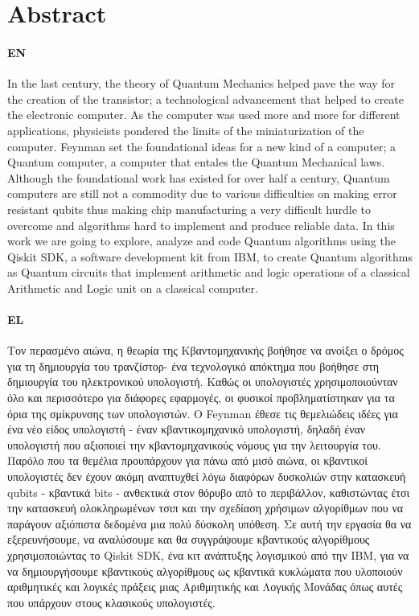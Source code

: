 \setlength{\parskip}{0pt}

\clearpage
\chapter*{Abstract}

\subsubsection{EN}
In the last century, the theory of Quantum Mechanics helped pave the way for the creation of the transistor; a 
technological advancement that helped to create the electronic computer. As the computer was used more and more
for different applications, physicists pondered the limits of the miniaturization of the computer. Feynman
set the foundational ideas for a new kind of a computer; a Quantum computer, a computer that entales the Quantum
Mechanical laws. Although the foundational work has existed for over half a century, Quantum computers are still not
a commodity due to various difficulties on making error resistant qubits thus making chip manufacturing a very
difficult hurdle to overcome and algorithms hard to implement and produce reliable data. In this work we are going
to explore, analyze and code Quantum algorithms using the Qiskit SDK, a software development kit from IBM, to
create Quantum algorithms as Quantum circuits that implement arithmetic and logic operations of a classical Arithmetic
and Logic unit on a classical computer.

\subsubsection{EL}
Τον περασμένο αιώνα, η θεωρία της Κβαντομηχανικής βοήθησε να ανοίξει ο δρόμος για τη δημιουργία του τρανζίστορ- ένα 
τεχνολογικό απόκτημα που βοήθησε στη δημιουργία του ηλεκτρονικού υπολογιστή. Καθώς οι υπολογιστές χρησιμοποιούνταν όλο και περισσότερο
για διάφορες εφαρμογές, οι φυσικοί προβληματίστηκαν για τα όρια της σμίκρυνσης των υπολογιστών. Ο Feynman
έθεσε τις θεμελιώδεις ιδέες για ένα νέο είδος υπολογιστή - έναν κβαντικομηχανικό υπολογιστή, δηλαδή έναν υπολογιστή που αξιοποιεί την 
κβαντομηχανικούς νόμους για την λειτουργία του. Παρόλο που τα θεμέλια προυπάρχουν για πάνω από μισό αιώνα, οι κβαντικοί υπολογιστές δεν έχουν ακόμη
αναπτυχθεί λόγω διαφόρων δυσκολιών στην κατασκευή qubits - κβαντικά bits - ανθεκτικά στον θόρυβο από το περιβάλλον, καθιστώντας έτσι την κατασκευή ολοκληρωμένων τσιπ 
και την σχεδίαση χρήσιμων αλγορίθμων που να παράγουν αξιόπιστα δεδομένα μια πολύ δύσκολη υπόθεση. Σε αυτή την εργασία θα να εξερευνήσουμε, να αναλύσουμε και 
θα συγγράψουμε κβαντικούς αλγορίθμους χρησιμοποιώντας το Qiskit SDK, ένα κιτ ανάπτυξης λογισμικού από την IBM, για να να δημιουργήσουμε κβαντικούς αλγορίθμους ως κβαντικά
κυκλώματα που υλοποιούν αριθμητικές και λογικές πράξεις μιας Αριθμητικής και Λογικής Μονάδας όπως αυτές που υπάρχουν στους κλασικούς υπολογιστές.